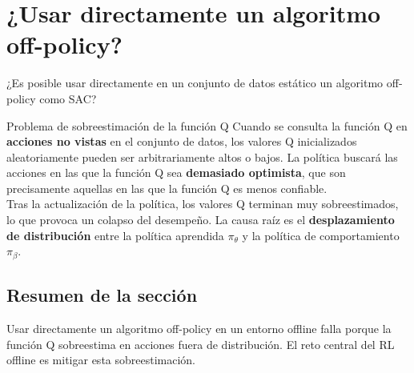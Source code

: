 \section{¿Usar directamente un algoritmo off-policy?}

¿Es posible usar directamente en un conjunto de datos estático un algoritmo off-policy como SAC?

\begin{warningbox}{Problema de sobreestimación de la función Q}
Cuando se consulta la función Q en \textbf{acciones no vistas} en el conjunto de datos, los valores Q inicializados aleatoriamente pueden ser arbitrariamente altos o bajos. La política buscará las acciones en las que la función Q sea \textbf{demasiado optimista}, que son precisamente aquellas en las que la función Q es menos confiable.
\\[6pt]
Tras la actualización de la política, los valores Q terminan muy sobreestimados, lo que provoca un colapso del desempeño. La causa raíz es el \textbf{desplazamiento de distribución} entre la política aprendida $\pi_\theta$ y la política de comportamiento $\pi_\beta$.
\end{warningbox}

\subsection{Resumen de la sección}

Usar directamente un algoritmo off-policy en un entorno offline falla porque la función Q sobreestima en acciones fuera de distribución. El reto central del RL offline es mitigar esta sobreestimación.
